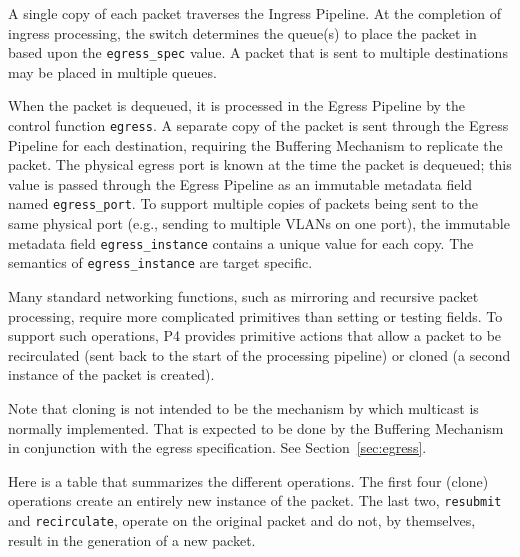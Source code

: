 \documentclass[12pt]{article}
\begin{document}
A single copy of each packet traverses the Ingress Pipeline. At the completion 
of ingress processing, the switch determines the queue(s) to place the packet 
in based upon the \texttt{egress_spec} value. A packet that is sent to multiple destinations 
may be placed in multiple queues.

When the packet is dequeued, it is processed in the Egress Pipeline by the 
control function \texttt{egress}. A separate copy of the packet is sent through 
the Egress Pipeline for each destination, requiring the Buffering Mechanism 
to replicate the packet. The physical egress port is known at the time the 
packet is dequeued; this value is passed through the Egress Pipeline as an 
immutable metadata field named \texttt{egress_port}. To support multiple copies 
of packets being sent to the same physical port (e.g., sending to multiple 
VLANs on one port), the immutable metadata field \texttt{egress_instance} contains 
a unique value for each copy. The semantics of \texttt{egress_instance} are target 
specific.


Many standard networking functions, such as mirroring and recursive packet 
processing, require more complicated primitives than setting or testing fields. 
To support such operations, P4 provides primitive actions that allow a packet 
to be recirculated (sent back to the start of the processing pipeline) or 
cloned (a second instance of the packet is created). 

Note that cloning is not intended to be the mechanism by which multicast is 
normally implemented. That is expected to be done by the Buffering Mechanism 
in conjunction with the egress specification. See Section~\ref{sec:egress}.
 
Here is a table that summarizes the different operations.  The first four 
(clone) operations create an entirely new instance of the packet.  The last 
two, \texttt{resubmit} and \texttt{recirculate}, operate on the original packet and do not, 
by themselves, result in the generation of a new packet.
\end{document}

